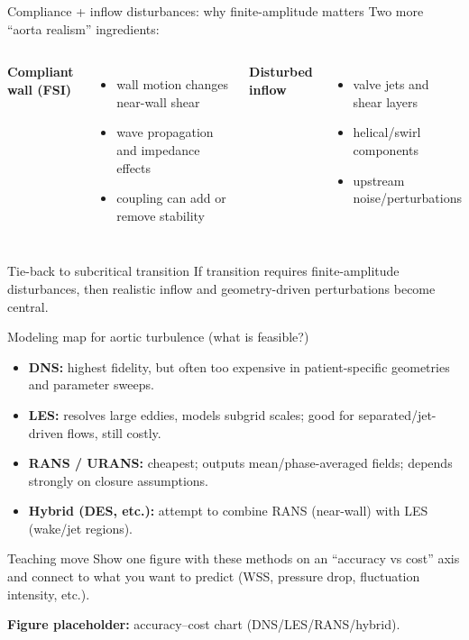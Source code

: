 \documentclass[aspectratio=169]{beamer}
\begin{document}
\begin{frame}{Compliance + inflow disturbances: why finite-amplitude matters}
Two more ``aorta realism'' ingredients:

\begin{columns}[T,onlytextwidth]
\textbf{Compliant wall (FSI)}
\begin{itemize}
  \item wall motion changes near-wall shear
  \item wave propagation and impedance effects
  \item coupling can add or remove stability
\end{itemize}

\textbf{Disturbed inflow}
\begin{itemize}
  \item valve jets and shear layers
  \item helical/swirl components
  \item upstream noise/perturbations
\end{itemize}
\end{columns}

\vspace{0.7em}
\begin{block}{Tie-back to subcritical transition}
If transition requires finite-amplitude disturbances, then realistic inflow and geometry-driven perturbations become central.
\end{block}
\end{frame}

\begin{frame}{Modeling map for aortic turbulence (what is feasible?)}
\begin{itemize}
  \item \textbf{DNS:} highest fidelity, but often too expensive in patient-specific geometries and parameter sweeps.
  \item \textbf{LES:} resolves large eddies, models subgrid scales; good for separated/jet-driven flows, still costly.
  \item \textbf{RANS / URANS:} cheapest; outputs mean/phase-averaged fields; depends strongly on closure assumptions.
  \item \textbf{Hybrid (DES, etc.):} attempt to combine RANS (near-wall) with LES (wake/jet regions).
\end{itemize}

\begin{block}{Teaching move}
Show one figure with these methods on an ``accuracy vs cost'' axis and connect to what you want to predict (WSS, pressure drop, fluctuation intensity, etc.).
\end{block}

\textbf{Figure placeholder:} accuracy--cost chart (DNS/LES/RANS/hybrid).
\end{frame}
\end{document}
